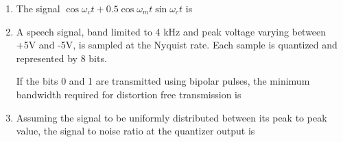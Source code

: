 \documentclass[a4paper, 11pt]{article}
\begin{document}
\begin{enumerate}
    \hfill{}
    
    \item The signal $\cos\omega_c t + 0.5 \cos\omega_m t \sin\omega_c t$ is
    \begin{enumerate}
    \end{enumerate}

    \hfill{}
    
    \item A speech signal, band limited to 4 kHz and peak voltage varying between +5V and -5V, is sampled at the Nyquist rate. Each sample is quantized and represented by 8 bits.
    
    If the bits 0 and 1 are transmitted using bipolar pulses, the minimum bandwidth required for distortion free transmission is
    \begin{enumerate}
    \end{enumerate}
    
    \hfill{}

    \item Assuming the signal to be uniformly distributed between its peak to peak value, the signal to noise ratio at the quantizer output is
    \begin{enumerate}
    \end{enumerate}
    

\end{enumerate}
\end{document}
